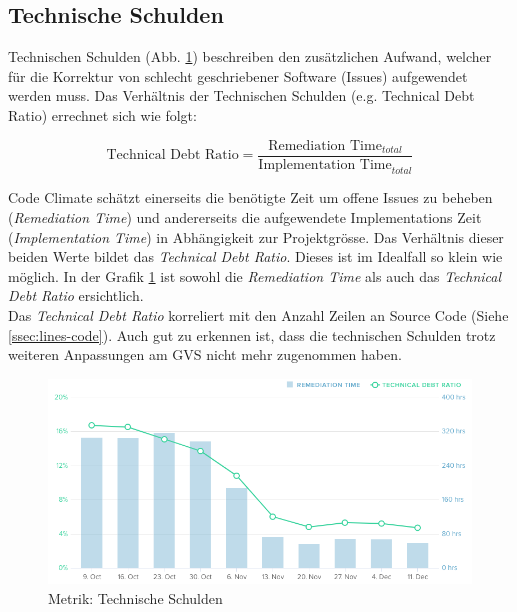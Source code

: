 \documentclass[11pt,a4paper,english,oneside]{book}
\numberwithin{equation}{chapter}
\begin{document}
	\subsection{Technische Schulden}
	Technischen Schulden (Abb. \ref{fig:metric-technical-debt}) beschreiben den zusätzlichen Aufwand, welcher für die Korrektur von schlecht geschriebener Software (Issues) aufgewendet werden muss. Das Verhältnis der Technischen Schulden (e.g. Technical Debt Ratio) errechnet sich wie folgt: 
	
	\begin{equation*}
		\text{Technical Debt Ratio} = \frac{\text{Remediation Time}_{total}}{\text{Implementation Time}_{total}}
	\end{equation*}
	
	\noindent
	Code Climate schätzt einerseits die benötigte Zeit um offene Issues zu beheben (\textit{Remediation Time}) und andererseits die aufgewendete Implementations Zeit (\textit{Implementation Time}) in Abhängigkeit zur Projektgrösse. Das Verhältnis dieser beiden Werte bildet das \textit{Technical Debt Ratio}. Dieses ist im Idealfall so klein wie möglich. In der Grafik \ref{fig:metric-technical-debt} ist sowohl die \textit{Remediation Time} als auch das \textit{Technical Debt Ratio} ersichtlich. \\
	
	\noindent
	Das \textit{Technical Debt Ratio} korreliert mit den Anzahl Zeilen an Source Code (Siehe \ref{ssec:lines-code}). Auch gut zu erkennen ist, dass die technischen Schulden trotz weiteren Anpassungen am GVS nicht mehr zugenommen haben.

	\begin{figure}[h!]
		\centering
		\includegraphics[width=0.9\linewidth]{assets/images/metrics/technical_debt}
		\caption{Metrik: Technische Schulden}
		\label{fig:metric-technical-debt}
	\end{figure}
	
\end{document}
